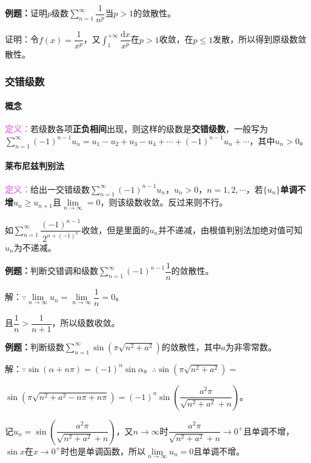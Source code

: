 \documentclass[UTF8, 12pt]{ctexart}
\begin{document}
        \textbf{例题：}证明$p$级数$\sum\limits_{n=1}^\infty\dfrac{1}{n^p}$当$p>1$的敛散性。

        证明：令$f(x)=\dfrac{1}{x^p}$，又$\int_1^{+\infty}\dfrac{\textrm{d}x}{x^p}$在$p>1$收敛，在$p\leqslant1$发散，所以得到原级数敛散性。

        \subsubsection{交错级数}

        \paragraph{概念} \leavevmode \medskip

        \textcolor{violet}{\textbf{定义：}}若级数各项\textbf{正负相间}出现，则这样的级数是\textbf{交错级数}，一般写为$\sum\limits_{n=1}^\infty(-1)^{n-1}u_n=u_1-u_2+u_3-u_4+\cdots+(-1)^{n-1}u_n+\cdots$，其中$u_n>0$。

        \paragraph{莱布尼兹判别法} \leavevmode \medskip

        \textcolor{violet}{\textbf{定义：}}给出一交错级数$\sum\limits_{n=1}^\infty(-1)^{n-1}u_n$，$u_n>0$，$n=1,2,\cdots$，若$\{u_n\}$\textbf{单调不增}$u_n\geqslant u_{n+1}$且$\lim\limits_{n\to\infty}=0$，则该级数收敛。反过来则不行。

        如$\sum\limits_{n=1}^\infty\dfrac{(-1)^{n-1}}{2^{n+(-1)^n}}$收敛，但是里面的$u_n$并不递减，由根值判别法加绝对值可知$u_n$为不递减。

        \textbf{例题：}判断交错调和级数$\sum\limits_{n=1}^\infty(-1)^{n-1}\dfrac{1}{n}$的敛散性。

        解：$\because\lim\limits_{n\to\infty}u_n=\lim\limits_{n\to\infty}\dfrac{1}{n}=0$。

        且$\dfrac{1}{n}>\dfrac{1}{n+1}$，所以级数收敛。

        \textbf{例题：}判断级数$\sum\limits_{n=1}^\infty\sin(\pi\sqrt{n^2+a^2})$的敛散性，其中$a$为非零常数。

        解：$\because\sin(\alpha+n\pi)=(-1)^n\sin\alpha$。$\therefore\sin(\pi\sqrt{n^2+a^2})=$

        $\sin(\pi\sqrt{n^2+a^2-n\pi+n\pi})=(-1)^n\sin\left(\dfrac{a^2\pi}{\sqrt{n^2+a^2}+n}\right)$。

        记$u_n=\sin\left(\dfrac{a^2\pi}{\sqrt{n^2+a^2}+n}\right)$，又$n\to\infty$时$\dfrac{a^2\pi}{\sqrt{n^2+a^2}+n}\to0^+$且单调不增，$\sin x$在$x\to0^+$时也是单调函数，所以$\lim\limits_{n\to\infty}u_n=0$且单调不增。
\end{document}
